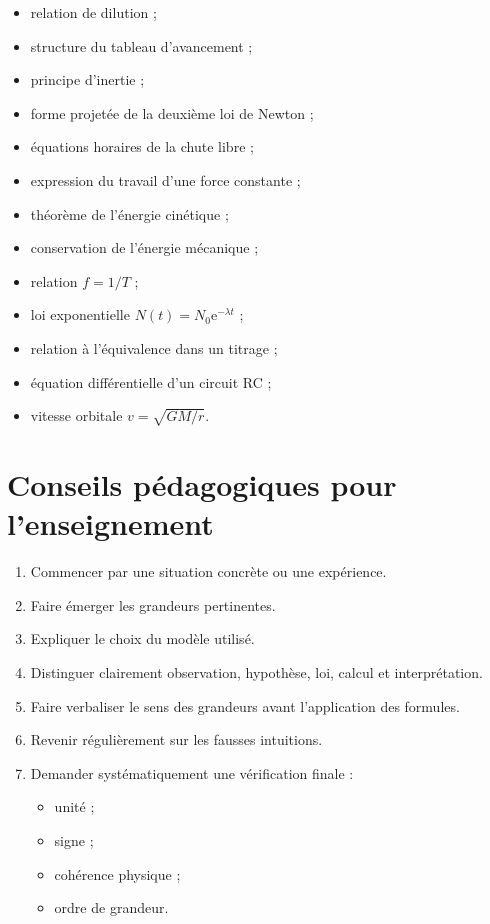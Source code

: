 \documentclass[11pt,a4paper]{article}
\newcommand{\e}{\mathrm{e}}
\begin{document}
\begin{itemize}
    \item relation de dilution ;
    \item structure du tableau d'avancement ;
    \item principe d'inertie ;
    \item forme projetée de la deuxième loi de Newton ;
    \item équations horaires de la chute libre ;
    \item expression du travail d'une force constante ;
    \item théorème de l'énergie cinétique ;
    \item conservation de l'énergie mécanique ;
    \item relation \(f=1/T\) ;
    \item loi exponentielle \(N(t)=N_0\e^{-\lambda t}\) ;
    \item relation à l'équivalence dans un titrage ;
    \item équation différentielle d'un circuit RC ;
    \item vitesse orbitale \(v=\sqrt{GM/r}\).
\end{itemize}

\section{Conseils pédagogiques pour l'enseignement}

\begin{enumerate}
    \item Commencer par une situation concrète ou une expérience.
    \item Faire émerger les grandeurs pertinentes.
    \item Expliquer le choix du modèle utilisé.
    \item Distinguer clairement observation, hypothèse, loi, calcul et interprétation.
    \item Faire verbaliser le sens des grandeurs avant l'application des formules.
    \item Revenir régulièrement sur les fausses intuitions.
    \item Demander systématiquement une vérification finale :
    \begin{itemize}
        \item unité ;
        \item signe ;
        \item cohérence physique ;
        \item ordre de grandeur.
    \end{itemize}
\end{enumerate}
\end{document}
